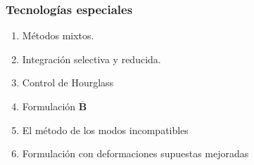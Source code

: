 \documentclass[handout]{beamer}
\begin{document}
\begin{frame}
\frametitle{Tecnologías especiales}
\begin{enumerate}
\item Métodos mixtos.
\item Integración selectiva y reducida.
\item Control de Hourglass
\item Formulación $\overline{\bm{B}}$
\item El método de los modos incompatibles
\item Formulación con deformaciones supuestas mejoradas
\end{enumerate}
\end{frame}
\end{document}
